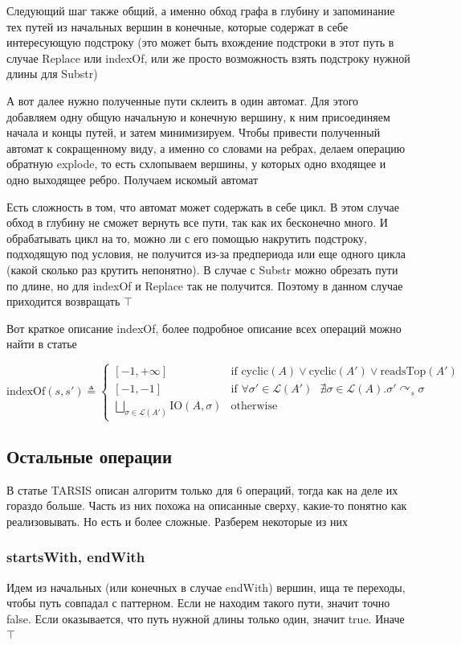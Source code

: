 Следующий шаг также общий, а именно обход графа в глубину и запоминание тех путей из начальных вершин в конечные, которые содержат в себе интересующую подстроку (это может быть вхождение подстроки в этот путь в случае Replace или indexOf, или же просто возможность взять подстроку нужной длины для Substr)

А вот далее нужно полученные пути склеить в один автомат. Для этого добавляем одну общую начальную и конечную вершину, к ним присоединяем начала и концы путей, и затем минимизируем. Чтобы привести полученный автомат к сокращенному виду, а именно со словами на ребрах, делаем операцию обратную explode, то есть схлопываем вершины, у которых одно входящее и одно выходящее ребро. Получаем искомый автомат

Есть сложность в том, что автомат может содержать в себе цикл. В этом случае обход в глубину не сможет вернуть все пути, так как их бесконечно много. И обрабатывать цикл на то, можно ли с его помощью накрутить подстроку, подходящую под условия, не получится из-за предпериода или еще одного цикла (какой сколько раз крутить непонятно). В случае с Substr можно обрезать пути по длине, но для indexOf и Replace так не получится. Поэтому в данном случае приходится возвращать $\top$

Вот краткое описание indexOf, более подробное описание всех операций можно найти в статье~\cite{tarsis2021}

$$
\text{indexOf}(s, s') \triangleq 
\begin{cases}
[-1, +\infty] & \text{if } \text{cyclic}(A) \lor \text{cyclic}(A') \lor \text{readsTop}(A') \\
[-1, -1] & \text{if } \forall \sigma' \in \mathcal{L}(A') \text{ } \nexists \sigma \in \mathcal{L}(A). \sigma' \curvearrowright_s \sigma \\
\underset{\sigma \in \mathcal{L}(A')}{\bigsqcup} \text{IO}(A, \sigma) & \text{otherwise}
\end{cases}
$$

\subsection{Остальные операции}
В статье TARSIS описан алгоритм только для 6 операций, тогда как на деле их гораздо больше. Часть из них похожа на описанные сверху, какие-то понятно как реализовывать. Но есть и более сложные. Разберем некоторые из них

\subsubsection*{startsWith, endWith}
Идем из начальных (или конечных в случае endWith) вершин, ища те переходы, чтобы путь совпадал с паттерном. Если не находим такого пути, значит точно false. Если оказывается, что путь нужной длины только один, значит true. Иначе $\top$

